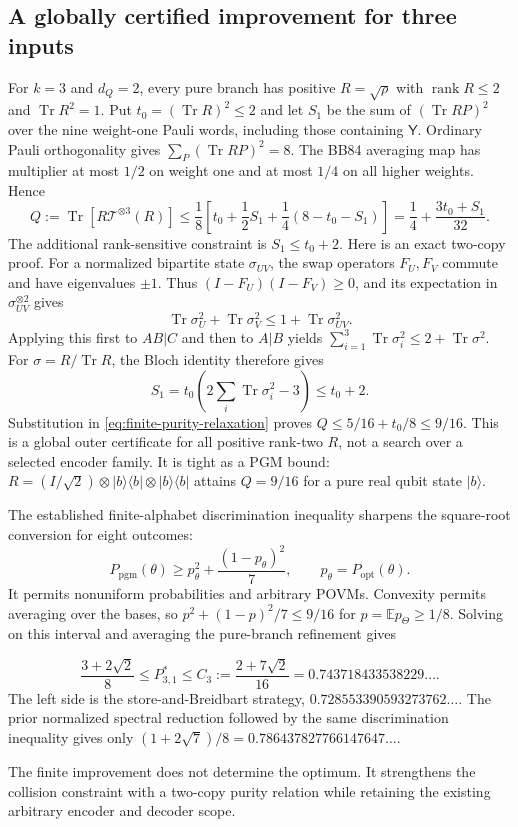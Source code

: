\documentclass[11pt,a4paper]{article}
\newcommand{\Tr}{\operatorname{Tr}}
\newcommand{\rank}{\operatorname{rank}}
\newcommand{\E}{\mathbb E}
\newcommand{\ket}[1]{\lvert #1\rangle}
\newcommand{\bra}[1]{\langle #1\rvert}
\newcommand{\pgm}{P_{\mathrm{pgm}}}
\newcommand{\popt}{P_{\mathrm{opt}}}
\newcommand{\YY}{\mathsf Y}
\begin{document}
\subsection{A globally certified improvement for three inputs}
For $k=3$ and $d_Q=2$, every pure branch has positive $R=\sqrt\rho$ with $\rank R\le2$ and $\Tr R^2=1$. Put $t_0=(\Tr R)^2\le2$ and let $S_1$ be the sum of $(\Tr RP)^2$ over the nine weight-one Pauli words, including those containing $\YY$. Ordinary Pauli orthogonality gives $\sum_P(\Tr RP)^2=8$. The BB84 averaging map has multiplier at most $1/2$ on weight one and at most $1/4$ on all higher weights. Hence
\begin{equation}
Q:=\Tr[R\mathcal T^{\otimes3}(R)]
\le\frac18\left[t_0+\frac12S_1+\frac14(8-t_0-S_1)\right]
=\frac14+\frac{3t_0+S_1}{32}.
\label{eq:finite-purity-relaxation}
\end{equation}
The additional rank-sensitive constraint is $S_1\le t_0+2$. Here is an exact two-copy proof. For a normalized bipartite state $\sigma_{UV}$, the swap operators $F_U,F_V$ commute and have eigenvalues $\pm1$. Thus $(I-F_U)(I-F_V)\ge0$, and its expectation in $\sigma_{UV}^{\otimes2}$ gives
\[
\Tr\sigma_U^2+\Tr\sigma_V^2\le1+\Tr\sigma_{UV}^2.
\]
Applying this first to $AB|C$ and then to $A|B$ yields $\sum_{i=1}^3\Tr\sigma_i^2\le2+\Tr\sigma^2$. For $\sigma=R/\Tr R$, the Bloch identity therefore gives
\[
S_1=t_0\left(2\sum_i\Tr\sigma_i^2-3\right)\le t_0+2.
\]
Substitution in \eqref{eq:finite-purity-relaxation} proves $Q\le5/16+t_0/8\le9/16$. This is a global outer certificate for all positive rank-two $R$, not a search over a selected encoder family. It is tight as a PGM bound: $R=(I/\sqrt2)\otimes\ket b\bra b\otimes\ket b\bra b$ attains $Q=9/16$ for a pure real qubit state $\ket b$.

The established finite-alphabet discrimination inequality sharpens the square-root conversion for eight outcomes:
\[
\pgm(\theta)\ge p_\theta^2+\frac{(1-p_\theta)^2}{7},
\qquad p_\theta=\popt(\theta).
\]
It permits nonuniform probabilities and arbitrary POVMs. Convexity permits averaging over the bases, so $p^2+(1-p)^2/7\le9/16$ for $p=\E p_\Theta\ge1/8$. Solving on this interval and averaging the pure-branch refinement gives
\begin{keybox}
\[
\frac{3+2\sqrt2}{8}\le P^*_{3,1}\le
C_3:=\frac{2+7\sqrt2}{16}=0.743718433538229\ldots.
\]
The left side is the store-and-Breidbart strategy, $0.728553390593273762\ldots$. The prior normalized spectral reduction followed by the same discrimination inequality gives only $(1+2\sqrt7)/8=0.786437827766147647\ldots$.
\end{keybox}
The finite improvement does not determine the optimum. It strengthens the collision constraint with a two-copy purity relation while retaining the existing arbitrary encoder and decoder scope.
\end{document}
